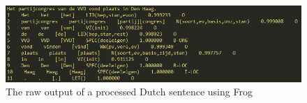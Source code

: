 \begin{figure}
    \centering
    \includegraphics[scale=0.7]{fig/frog_output}
    \caption{The raw output of a processed Dutch sentence using Frog}
    \label{fig:frog_out}
\end{figure}





